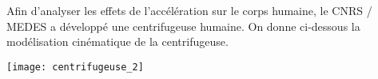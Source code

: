 \def\xxactivite{Révisions \ifprof -- Corrigé \else \fi} %
\def\xxauteur{\textsl{Xavier Pessoles}}


\def\xxnumchapitre{Révision cinématique \vspace{.2cm}}
\def\xxchapitre{\hspace{.12cm} Résolution cinématique}
\def\xxonglet{\textsf{Rév -- Stat}}
\def\xxactivite{TD 01}
\def\xxauteur{\textsl{Xavier Pessoles}}

\def\xxpied{%
Révision cinématique \\
Fiche  2 -- \xxactivite%
}


\def\xxtitreexo{Centrifugeuse humaine}
\def\xxsourceexo{\hspace{.2cm} \footnotesize{Xavier Pessoles}}

\def\xxcompetences{%
\textsl{%
\textbf{Savoirs et compétences :}\\} \vspace{-.5cm}
}


\def\xxfigures{
\texttt{[image: centrifugeuse\_1]}
}%




\setlength{\columnseprule}{.1pt}

\pagestyle{fancy}
\thispagestyle{plain}



\def\columnseprulecolor{\color{ocre}}
\setlength{\columnseprule}{0.4pt} 


\setcounter{exo}{0}





Afin d'analyser les effets de l'accélération sur le corps humaine, le CNRS / MEDES a développé une centrifugeuse humaine. On donne ci-dessous la modélisation cinématique de la centrifugeuse.

\begin{center}
\texttt{[image: centrifugeuse\_2]}

\end{center}


